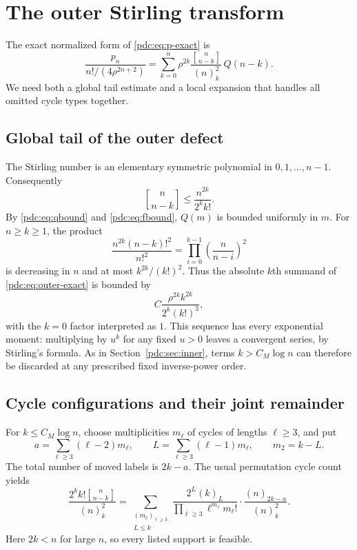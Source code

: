 \documentclass[11pt,letterpaper]{article}
\theoremstyle{remark}\newtheorem{remark}[theorem]{Remark}
\newcommand{\fall}[2]{(#1)_{#2}}
\newcommand{\stirone}[2]{\genfrac{[}{]}{0pt}{}{#1}{#2}}
\begin{document}
\section{The outer Stirling transform}
\label{pdc:sec:outer}
The exact normalized form of \eqref{pdc:eq:p-exact} is
\begin{equation}\label{pdc:eq:outer-exact}
 \frac{p_n}{n!/(4\rho^{2n+2})}
 =\sum_{k=0}^n\rho^{2k}
          \frac{\stirone{n}{n-k}}{\fall{n}{k}^2}\,Q(n-k).
\end{equation}
We need both a global tail estimate and a local expansion that handles all omitted cycle types together.

\subsection{Global tail of the outer defect}
The Stirling number is an elementary symmetric polynomial in $0,1,\ldots,n-1$. Consequently
\[
 \stirone{n}{n-k}\leq\frac{n^{2k}}{2^k k!}.
\]
By \eqref{pdc:eq:qbound} and \eqref{pdc:eq:fbound}, $Q(m)$ is bounded uniformly in $m$. For $n\geq k\geq1$, the product
\[
 \frac{n^{2k}(n-k)!^2}{n!^2}
   =\prod_{i=0}^{k-1}\left(\frac{n}{n-i}\right)^2
\]
is decreasing in $n$ and at most $k^{2k}/(k!)^2$. Thus the absolute $k$th summand of \eqref{pdc:eq:outer-exact} is bounded by
\begin{equation}\label{pdc:eq:outer-majorant}
 C\frac{\rho^{2k}k^{2k}}{2^k(k!)^3},
\end{equation}
with the $k=0$ factor interpreted as $1$. This sequence has every exponential moment: multiplying by $u^k$ for any fixed $u>0$ leaves a convergent series, by Stirling's formula. As in Section~\ref{pdc:sec:inner}, terms $k>C_M\log n$ can therefore be discarded at any prescribed fixed inverse-power order.

\subsection{Cycle configurations and their joint remainder}
For $k\leq C_M\log n$, choose multiplicities $m_\ell$ of cycles of lengths $\ell\geq3$, and put
\begin{equation}\label{pdc:eq:cycle-defects}
 a=\sum_{\ell\geq3}(\ell-2)m_\ell,\qquad
 L=\sum_{\ell\geq3}(\ell-1)m_\ell,\qquad m_2=k-L.
\end{equation}
The total number of moved labels is $2k-a$. The usual permutation cycle count yields
\begin{equation}\label{pdc:eq:cycle-exact}
 \frac{2^k k!\stirone{n}{n-k}}{\fall{n}{k}^2}
 =\sum_{\substack{(m_\ell)_{\ell\geq3}\\ L\leq k}}
 \frac{2^L\fall{k}{L}}{\prod_{\ell\geq3}\ell^{m_\ell}m_\ell!}\cdot
 \frac{\fall{n}{2k-a}}{\fall{n}{k}^2}.
\end{equation}
Here $2k<n$ for large $n$, so every listed support is feasible.
\end{document}
